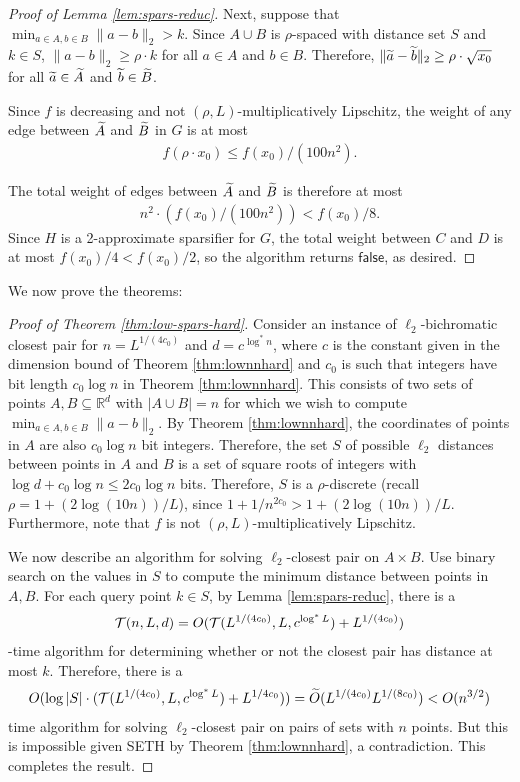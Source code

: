 \begin{proof}[Proof of Lemma \ref{lem:spars-reduc}]
Next, suppose that $\min_{a\in A, b\in B} \|a - b\|_2 > k$. Since $A\cup B$ is $\rho$-spaced with distance set $S$ and $k\in S$, $\| a - b \|_2 \ge \rho \cdot k$ for all $a\in A$ and $b\in B$. Therefore, $\| \widetilde{a} - \widetilde{b} \|_2 \ge \rho \cdot \sqrt{x_0}$ for all $\widetilde{a} \in \widetilde{A}$ and $\widetilde{b} \in \widetilde{B}$. 

Since $f$ is decreasing and not $(\rho,L)$-multiplicatively Lipschitz, the weight of any edge between $\widetilde{A}$ and $\widetilde{B}$ in $G$ is at most 
\begin{align*}
f(\rho \cdot x_0) \le f(x_0)/(100 n^2).
\end{align*} 

The total weight of edges between $\widetilde{A}$ and $\widetilde{B}$ is therefore at most 
\begin{align*}
n^2 \cdot (f(x_0)/(100 n^2)) < f(x_0)/8.
\end{align*}
Since $H$ is a 2-approximate sparsifier for $G$, the total weight between $C$ and $D$ is at most $f(x_0)/4 < f(x_0)/2$, so the algorithm returns $\mathsf{false}$, as desired.
\end{proof}

We now prove the theorems:

\begin{proof}[Proof of Theorem \ref{thm:low-spars-hard}]
Consider an instance of $\ell_2$-bichromatic closest pair for $n = L^{1/(4c_0)}$ and $d = c^{\log^* n}$, where $c$ is the constant given in the dimension bound of Theorem \ref{thm:lownnhard} and $c_0$ is such that integers have bit length $c_0\log n$ in Theorem \ref{thm:lownnhard}. This consists of two sets of points $A,B\subseteq \mathbb{R}^d$ with $|A\cup B| = n$ for which we wish to compute $\min_{a\in A, b\in B} \|a - b\|_2$. By Theorem \ref{thm:lownnhard}, the coordinates of points in $A$ are also $c_0\log n$ bit integers. Therefore, the set $S$ of possible $\ell_2$ distances between points in $A$ and $B$ is a set of square roots of integers with $\log d + c_0\log n\le 2c_0\log n$ bits. Therefore, $S$ is a $\rho$-discrete (recall $\rho = 1 + (2\log (10n))/L$), since $1 + 1/n^{2c_0} > 1 + (2\log (10n))/L$. Furthermore, note that $f$ is not $(\rho,L)$-multiplicatively Lipschitz.

We now describe an algorithm for solving $\ell_2$-closest pair on $A\times B$. Use binary search on the values in $S$ to compute the minimum distance between points in $A,B$. For each query point $k\in S$, by Lemma \ref{lem:spars-reduc}, there is a 
\begin{align*}
\mathcal{T}(n,L,d) = O(\mathcal{T}(L^{1/(4c_0)},L,c^{\log^* L}) + L^{1/(4c_0)})
\end{align*}
-time algorithm for determining whether or not the closest pair has distance at most $k$. Therefore, there is a 
\begin{align*}
O( \log |S| \cdot (\mathcal{T}(L^{1/(4c_0)},L,c^{\log^* L}) + L^{1/4c_0})) = \widetilde{O}(L^{1/(4c_0)}L^{1/(8c_0)}) < O( n^{3/2} )
\end{align*}
time algorithm for solving $\ell_2$-closest pair on pairs of sets with $n$ points. But this is impossible given {\sf SETH} by Theorem \ref{thm:lownnhard}, a contradiction. This completes the result.
\end{proof}

